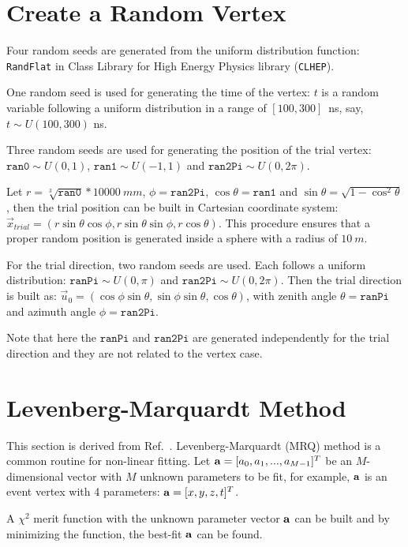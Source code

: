 \section{Create a Random Vertex}\label{appendix:random_gen}

Four random seeds are generated from the uniform distribution function: \texttt{RandFlat} in Class Library for High Energy Physics library (\texttt{CLHEP}).

One random seed is used for generating the time of the vertex: $t$ is a random variable following a uniform distribution in a range of $[100, 300]$~ns, say, $t\sim U(100,300)$ ns.

Three random seeds are used for generating the position of the trial vertex: $\texttt{ran0}\sim U(0,1)$, $\texttt{ran1}\sim U(-1,1)$ and $\texttt{ran2Pi}\sim U(0,2\pi)$. 

Let $r=\sqrt[3]{\texttt{ran0}}*10000~mm$, $\phi=\texttt{ran2Pi}$, $\cos\theta=\texttt{ran1}$ and $\sin\theta=\sqrt{1-{\cos^2\theta}}$, then the trial position can be built in Cartesian coordinate system: $\vec{x}_{trial}=(r\sin\theta\cos\phi, r\sin\theta\sin\phi, r\cos\theta)$. This procedure ensures that a proper random position is generated inside a sphere with a radius of $10~m$.

For the trial direction, two random seeds are used. Each follows a uniform distribution: $\texttt{ranPi}\sim U(0,\pi)$ and $\texttt{ran2Pi}\sim U(0,2\pi)$. Then the trial direction is built as: $\vec{u}_{0}=(\cos\phi\sin\theta,\sin\phi\sin\theta,\cos\theta)$, with zenith angle $\theta=\texttt{ranPi}$ and azimuth angle $\phi=\texttt{ran2Pi}$.

Note that here the $\texttt{ranPi}$ and $\texttt{ran2Pi}$ are generated independently for the trial direction and they are not related to the vertex case.

\section[Levenberg-Marquardt Method]{Levenberg-Marquardt Method}\label{appendix:MRQ}
This section is derived from Ref.~\cite{press2007numerical}. Levenberg-Marquardt (MRQ) method is a common routine for non-linear fitting. Let ${\bf a} = [a_0, a_1, ..., a_{M-1}]^T$ be an $M$-dimensional vector with $M$ unknown parameters to be fit, for example, $\bf a$ is an event vertex with 4 parameters: ${\bf a}=[x,y,z,t]^T$.

A $\chi^2$ merit function with the unknown parameter vector $\bf a$ can be built and by minimizing the function, the best-fit $\bf a$ can be found.

